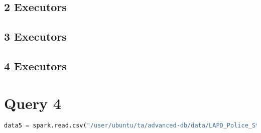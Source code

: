 \documentclass{article}
\begin{document}
\subsection*{2 Executors}
\subsection*{3 Executors}

\subsection*{4 Executors}

\section*{Query 4}

\begin{lstlisting}[language = Python]
    data5 = spark.read.csv("/user/ubuntu/ta/advanced-db/data/LAPD_Police_Stations.csv", header=True, schema=schema4)

\end{lstlisting}
    
\end{document}
